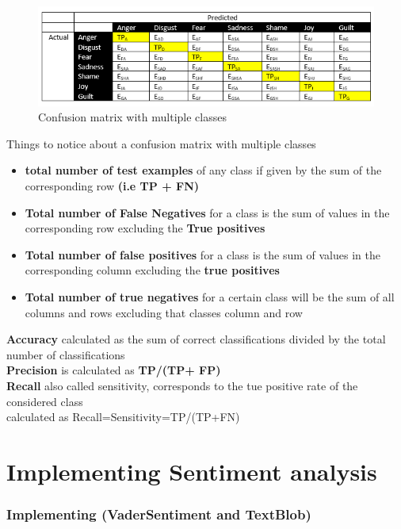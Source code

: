 \begin{figure}[h]
    \centering
    \includegraphics{images/confusion_matrix_2.png}
    \caption{Confusion matrix with multiple classes}
\end{figure}

Things to notice about a confusion matrix with multiple classes
\begin{itemize}
\item \textbf{total number of test examples} of any class if given by the sum of the corresponding row \textbf{(i.e TP + FN)}
\item \textbf{Total number of False Negatives} for a class is the sum of values in the corresponding row excluding the \textbf{True positives}

\item \textbf{Total number of false positives} for a class is the sum of values in the corresponding column excluding the \textbf{true positives}

\item \textbf{Total number of true negatives} for a certain class will be the sum of all columns and rows  excluding that classes column and row
\end{itemize}
  
\textbf{Accuracy} calculated as the sum of correct classifications divided by the total number of classifications\\
\textbf{Precision} is calculated as \textbf{ TP/(TP+ FP)}\\
\textbf{Recall} also called sensitivity, corresponds to the tue positive rate of the considered class
\\
calculated as Recall=Sensitivity=TP/(TP+FN)

\clearpage



\chapter{Implementing Sentiment analysis}

\subsection{Implementing (VaderSentiment and TextBlob)}


